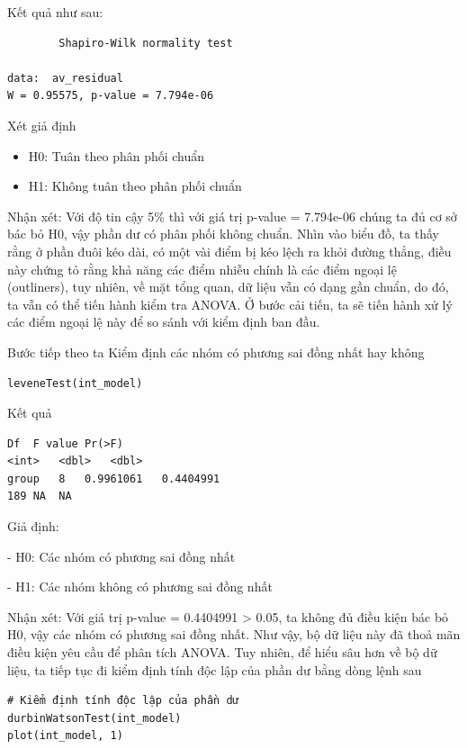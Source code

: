 \newpage
Kết quả như sau:
\begin{lstlisting}
    	Shapiro-Wilk normality test

data:  av_residual
W = 0.95575, p-value = 7.794e-06
\end{lstlisting}

Xét giả định
\begin{itemize}
    \item H0: Tuân theo phân phối chuẩn
    \item H1: Không tuân theo phân phối chuẩn
\end{itemize}

Nhận xét: Với độ tin cậy 5\% thì với giá trị p-value = 7.794e-06 chúng ta đủ cơ sở bác bỏ H0, vậy phần dư có phân phối không chuẩn. Nhìn vào biểu đồ, ta thấy rằng ở phần đuôi kéo dài, có một vài điểm bị kéo lệch ra khỏi đường thẳng, điều này chứng tỏ rằng khả năng các điểm nhiễu chính là các điểm ngoại lệ (outliners), tuy nhiên, về mặt tổng quan, dữ liệu vẫn có dạng gần chuẩn, do đó, ta vẫn có thể tiến hành kiểm tra ANOVA. Ở bước cải tiến, ta sẽ tiến hành xử lý các điểm ngoại lệ này để so sánh với kiểm định ban đầu.

Bước tiếp theo ta Kiểm định các nhóm có phương sai đồng nhất hay không
\begin{lstlisting}
leveneTest(int_model)
\end{lstlisting}

Kết quả
\begin{lstlisting}
Df	F value	Pr(>F)
<int>	<dbl>	<dbl>
group	8	0.9961061	0.4404991
189	NA	NA
\end{lstlisting}

Giả định:

- H0: Các nhóm có phương sai đồng nhất

- H1: Các nhóm không có phương sai đồng nhất

Nhận xét: Với giá trị p-value = 0.4404991 > 0.05, ta không đủ điều kiện bác bỏ H0, vậy các nhóm có phương sai đồng nhất. Như vậy, bộ dữ liệu này đã thoả mãn điều kiện yêu cầu để phân tích ANOVA. Tuy nhiên, để hiểu sâu hơn về bộ dữ liệu, ta tiếp tục đi kiểm định tính độc lập của phần dư bằng dòng lệnh sau

\newpage
\begin{lstlisting}
# Kiểm định tính độc lập của phần dư
durbinWatsonTest(int_model)
plot(int_model, 1)
\end{lstlisting}

